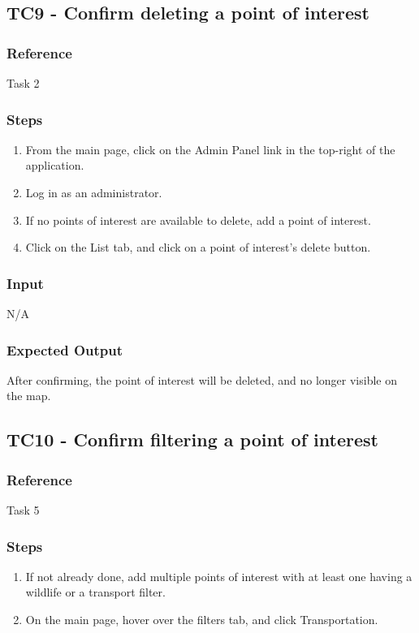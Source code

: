 \subsection{TC9 - Confirm deleting a point of interest}

\subsubsection{Reference}

Task 2

\subsubsection{Steps}
\begin{enumerate}
		\item From the main page, click on the Admin Panel link in the top-right of the application.
	\item Log in as an administrator.
	\item If no points of interest are available to delete, add a point of interest.
	\item Click on the List tab, and click on a point of interest's delete button.
	\end{enumerate}
\subsubsection{Input}
N/A
\subsubsection{Expected Output}
After confirming, the point of interest will be deleted, and no longer visible on the map.
\subsection{TC10 - Confirm filtering a point of interest}

\subsubsection{Reference}

Task 5

\subsubsection{Steps}
\begin{enumerate}
\item If not already done, add multiple points of interest with at least one having a wildlife or a transport filter.
\item On the main page, hover over the filters tab, and click Transportation.
\end{enumerate}
